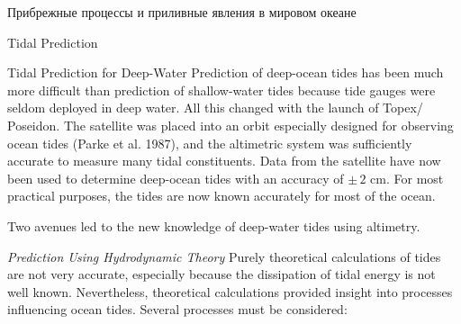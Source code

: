 \begin{chapter}{Прибрежные процессы и приливные явления в мировом океане}
\begin{section}{Tidal Prediction}
\begin{paragraph}{Tidal Prediction for Deep-Water}
Prediction of deep-ocean tides has
been much more difficult than prediction of shallow-water tides
because tide gauges were seldom deployed in deep water. All this
changed with the launch of Topex/
Poseidon. The satellite
was placed into an orbit especially designed for observing ocean tides
(Parke et al. 1987), and the altimetric system was sufficiently
accurate to measure many tidal constituents.
Data from the satellite have now been used to determine deep-ocean
tides with an accuracy of $\pm \, 2$ cm. For
most practical purposes, the tides are now known accurately for most
of the ocean.
%

Two avenues led to the new knowledge of deep-water tides using
altimetry.
%

\textit{Prediction Using Hydrodynamic Theory} Purely theoretical
calculations of 
tides are not very accurate, especially because the dissipation of
tidal energy is not well known. Nevertheless, theoretical calculations
provided insight into processes influencing ocean tides. Several
processes must be considered:
%


\end{paragraph}
\end{section}
\end{chapter}
